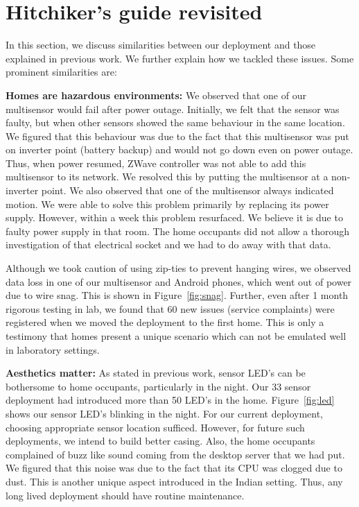 \documentclass[10pt]{sensys-proc}
\newcommand{\figref}[1]{Figure~\ref{#1}}
\begin{document}
\section{Hitchiker's guide revisited}
\label{sec:common}
In this section, we discuss similarities between our deployment and those explained in previous work. We further explain how we tackled these issues. Some prominent similarities are:

\noindent \textbf{Homes are hazardous environments:} We observed that one of our multisensor would fail after power outage. Initially, we felt that the sensor was faulty, but when other sensors showed the same behaviour in the same location. We figured that this behaviour was due to the fact that this multisensor was put on inverter point (battery backup) and would not go down even on power outage. Thus, when power resumed, ZWave controller was not able to add this multisensor to its network. We resolved this by putting the multisensor at a non-inverter point. We also observed that one of the multisensor always indicated motion. We were able to solve this problem primarily by replacing its power supply. However, within a week this problem resurfaced. We believe it is due to faulty power supply in that room. The home occupants did not allow a thorough investigation of that electrical socket and we had to do away with that data.

\noindent Although we took caution of using zip-ties to prevent hanging wires, we observed data loss in one of our multisensor and Android phones, which went out of power due to wire snag. This is shown in \figref{fig:snag}. Further, even after 1 month rigorous testing in lab, we found that 60 new issues (service complaints) were registered when we moved the deployment to the first home. This is only a testimony that homes present a unique scenario which can not be emulated well in laboratory settings.

\noindent \textbf{Aesthetics matter:} As stated in previous work, sensor LED's can be bothersome to home occupants, particularly in the night. Our 33 sensor deployment had introduced more than 50 LED's in the home. \figref{fig:led} shows our sensor LED's blinking in the night. For our current deployment, choosing appropriate sensor location sufficed. However, for future such deployments, we intend to build better casing. Also, the home occupants complained of buzz like sound coming from the desktop server that we had put. We figured that this noise was due to the fact that its CPU was clogged due to dust. This is another unique aspect introduced in the Indian setting. Thus, any long lived deployment should have routine maintenance.
\end{document}
